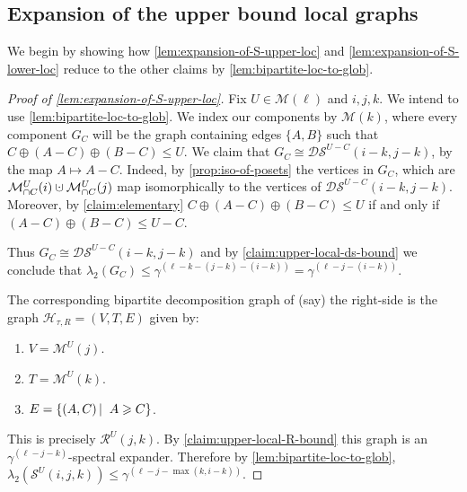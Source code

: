 \documentclass[10pt,a4paper]{article}
\newcommand{\prettyref}[1]{\cref{#1}}
\theoremstyle{definition}
\theoremstyle{remark}
\newcommand\sett[2]{\left\{ #1 \left| \; \vphantom{#1 #2} \right. #2  \right\}}
\newcommand{\set}[1]{\{#1\}}
\DeclareMathOperator{\row}{row}
\renewcommand{\leq}{\leqslant}
\renewcommand{\geq}{\geqslant}
\numberwithin{equation}{section}
\newcommand{\dunion}{\mathbin{\mathaccent\cdot\cup}}
\let\pref=\prettyref
\def\B{\mathcal{H}}
\def\MP{\mathcal{M}}
\begin{document}
\subsection{Expansion of the upper bound local graphs}
We begin by showing how \pref{lem:expansion-of-S-upper-loc} and \pref{lem:expansion-of-S-lower-loc} reduce to the other claims by \pref{lem:bipartite-loc-to-glob}.
\begin{proof}[Proof of \pref{lem:expansion-of-S-upper-loc}]
    Fix \(U \in \MP(\ell)\) and \(i,j,k\). We intend to use \pref{lem:bipartite-loc-to-glob}. We index our components by \(\MP(k)\), where every component \(G_C\) will be the graph containing edges \(\set{A,B}\) such that \(C \oplus (A-C) \oplus (B-C) \leq U\). We claim that \(G_C \cong \mathcal{DS}^{U-C}(i-k,j-k)\), by the map \(A \mapsto A-C\). Indeed, by \pref{prop:iso-of-posets} the vertices in \(G_C\), which are \(\MP^U_{\cap C}(i)\dunion \MP^U_{\cap C}(j)\) map isomorphically to the vertices of \(\mathcal{DS}^{U-C}(i-k,j-k)\). Moreover, by \pref{claim:elementary} \(C \oplus (A-C) \oplus (B-C) \leq U\) if and only if \((A-C) \oplus (B-C) \leq U-C\). 
    
    Thus \(G_C \cong \mathcal{DS}^{U-C}(i-k,j-k)\) and by \pref{claim:upper-local-ds-bound} we conclude that \(\lambda_2(G_C) \leq \gamma^{(\ell-k-(j-k)-(i-k))}=\gamma^{ (\ell-j-(i-k))}\).
    
    The corresponding bipartite decomposition graph of (say) the right-side is the graph \(\B_{\tau,R}=(V,T,E)\) given by:
    \begin{enumerate}
        \item \(V = \MP^U(j)\).
        \item \(T=\MP^U(k)\).
        \item \(E = \sett{(A,C)}{A \geq C}\).
    \end{enumerate}
    This is precisely \(\mathcal{R}^U(j,k)\). By \pref{claim:upper-local-R-bound} this graph is an \(\gamma^{(\ell-j-k)}\)-spectral expander. Therefore by \pref{lem:bipartite-loc-to-glob}, \(\lambda_2(\mathcal{S}^{U}(i,j,k)) \leq \gamma^{(\ell-j-\max(k,i-k))}\).
\end{proof}
\end{document}
